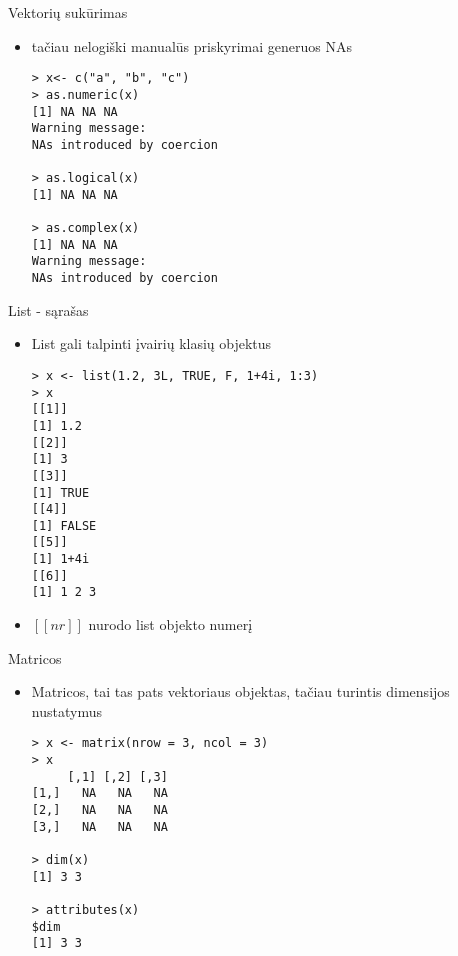 \documentclass[11pt,xcolor=table]{beamer}
\begin{document}

\begin{frame}[fragile]{Vektorių sukūrimas}
\begin{itemize}
\item tačiau nelogiški manualūs priskyrimai generuos NAs
\begin{lstlisting}
> x<- c("a", "b", "c")
> as.numeric(x)
[1] NA NA NA
Warning message:
NAs introduced by coercion 

> as.logical(x)
[1] NA NA NA

> as.complex(x)
[1] NA NA NA
Warning message:
NAs introduced by coercion 
\end{lstlisting}
\end{itemize}
\end{frame}


\begin{frame}[fragile]{List - sąrašas}
\begin{itemize}
\item List gali talpinti įvairių klasių objektus
\begin{lstlisting}
> x <- list(1.2, 3L, TRUE, F, 1+4i, 1:3) 
> x
[[1]]
[1] 1.2
[[2]]
[1] 3
[[3]]
[1] TRUE
[[4]]
[1] FALSE
[[5]]
[1] 1+4i
[[6]]
[1] 1 2 3
\end{lstlisting}
\item $[[nr]]$  nurodo list objekto numerį
\end{itemize}
\end{frame}


\begin{frame}[fragile]{Matricos}
\begin{itemize}
\item Matricos, tai tas pats vektoriaus objektas, tačiau turintis dimensijos nustatymus
\begin{lstlisting}
> x <- matrix(nrow = 3, ncol = 3)
> x
     [,1] [,2] [,3]
[1,]   NA   NA   NA
[2,]   NA   NA   NA
[3,]   NA   NA   NA

> dim(x)
[1] 3 3

> attributes(x)
$dim
[1] 3 3
\end{lstlisting}
\end{itemize}
\end{frame}

\end{document}
